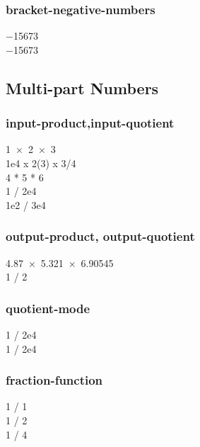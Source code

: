 \documentclass{article}
\begin{document}
\subsubsection{bracket-negative-numbers}
\num{-15673} \\
\num[bracket-negative-numbers]{-15673} \\

\subsection{Multi-part Numbers}

\subsubsection{input-product,input-quotient}
\num{1 x 2 x 3} \\
\num{1e4 x 2(3) x 3/4} \\
\num[input-product=*]{4 * 5 * 6} \\
\num{ 1 / 2e4 } \\
\num{ 1e2 / 3e4 }\\

\subsubsection{output-product, output-quotient}
\num[output-product = \cdot]{4.87 x 5.321 x 6.90545} \\
\num[output-quotient = \text{ div }]{1 / 2}\\

\subsubsection{quotient-mode}
\num{1 / 2e4} \\
\num[quotient-mode = fraction]{1 / 2e4}\\

\subsubsection{fraction-function}
{
\num{1 / 1}\\
\num[fraction-function= \dfrac]{1 / 2}\\
\num[fraction-function= \tfrac]{1 / 4}\\
}
\end{document}
